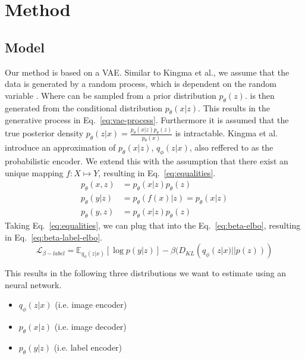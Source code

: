 \chapter{Method}\label{chapter:first_real_chapter}

\section{Model}
Our method is based on a VAE\cite{kingma2014autoencodingvariationalbayes}. 
Similar to Kingma et al., we assume that the data is generated by a random process, which is dependent on the random variable . Where  can be sampled from a prior distribution $p_\theta(z)$.  is then generated from the conditional distribution $p_\theta(x|z)$. This results in the generative process in Eq.~\ref{eq:vae-process}. Furthermore it is assumed that the true posterior density $p_\theta(z|x) = \frac{p_\theta(x|z)p_\theta(z)}{p_\theta(x)}$ is intractable.  Kingma et al. introduce an approximation of $p_\theta(x|z)$, $q_\phi(z|x)$, also reffered to as the probabilistic encoder.
We extend this with the assumption that there exist an unique mapping $f: X \mapsto Y$, resulting in Eq.~\ref{eq:equalities}. 
\begin{subequations}
    \begin{align}
        p_\theta(x, z) & = p_\theta(x|z)p_\theta(z) \label{eq:vae-process}        \\
        p_\theta(y|z)  & = p_\theta(f(x)|z) = p_\theta(x|z) \label{eq:equalities} \\
        p_\theta(y, z) & = p_\theta(x|z)p_\theta(z)\label{eq:label-process}
    \end{align}
\end{subequations}
Taking Eq.~\ref{eq:equalities}, we can plug that into the Eq.~\ref{eq:beta-elbo}, resulting in Eq.~\ref{eq:beta-label-elbo}.
\begin{equation}
    \label{eq:beta-label-elbo}
    \mathcal{L}_{\beta-label} = \mathbb{E}_{q_{\phi}(z|x)}[\log p(y|z)] - \beta (D_{KL}(q_{\phi}(z|x) || p(z)))
\end{equation}


This results in the following three distributions we want to estimate using an neural network.
\begin{itemize}
    \item $q_\phi(z|x)$ (i.e. image encoder)
    \item $p_\theta(x|z)$ (i.e. image decoder)
    \item $p_\theta(y|z)$ (i.e. label encoder)
\end{itemize}

